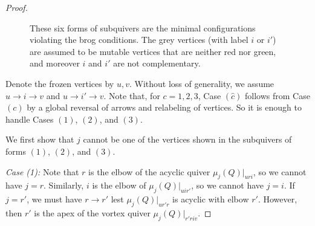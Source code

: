 \documentclass[12pt]{amsart}
\theoremstyle{definition}
\theoremstyle{remark}
\numberwithin{equation}{section}
\begin{document}
\begin{proof}
\begin{figure}[h]
\caption{
These six forms of subquivers are the minimal configurations violating the brog conditions.  The grey vertices (with label $i$ or $i'$) are assumed to be mutable vertices that are neither red nor green, and moreover $i$ and $i'$ are not complementary.}
\label{fig: forbidden brog subquivers}
\end{figure}

Denote the frozen vertices by $u,v$.  Without loss of generality, we assume $u \rightarrow i \rightarrow v$ and $u \rightarrow i' \rightarrow v$.  Note that, for $c = 1,2,3$, Case $(\hat{c})$ follows from Case $(c)$ by a global reversal of arrows and relabeling of vertices.  So it is enough to handle Cases $(1)$, $(2)$, and $(3)$.

We first show that $j$ cannot be one of the vertices shown in the subquivers of forms $(1)$, $(2)$, and $(3)$.

\emph{Case (1):} Note that $r$ is the elbow of the acyclic quiver $\mu_j(Q)|_{uri}$, so we cannot have $j = r$.  Similarly, $i$ is the elbow of $\mu_j(Q)|_{uir'}$, so we cannot have $j = i$.  If $j = r'$, we must have $r \rightarrow r'$ lest $\mu_j(Q)|_{ur'r}$ is acyclic with elbow $r'$.  However, then $r'$ is the apex of the vortex quiver $\mu_j(Q)|_{r'riv}$.  


\end{proof}
\end{document}
